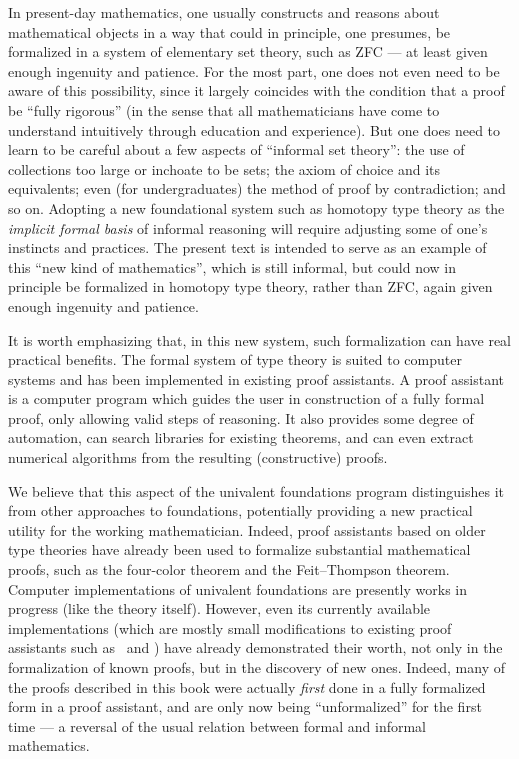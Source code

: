 In present-day mathematics, one usually constructs and reasons about mathematical objects in a way that could in principle, one presumes, be formalized in a system of elementary set theory, such as ZFC --- at least given enough ingenuity and patience.
For the most part, one does not even need to be aware of this possibility, since it largely coincides with the condition that a proof be ``fully rigorous'' (in the sense that all mathematicians have come to understand intuitively through education and experience).
But one does need to learn to be careful about a few aspects of ``informal set theory'': the use of collections too large or inchoate to be sets; the axiom of choice and its equivalents; even (for undergraduates) the method of proof by contradiction; and so on.
Adopting a new foundational system such as homotopy type theory as the \emph{implicit formal basis} of informal reasoning will require adjusting some of one's instincts and practices.
The present text is intended to serve as an example of this ``new kind of mathematics'', which is still informal, but could now in principle be formalized in homotopy type theory, rather than ZFC, again given enough ingenuity and patience.

It is worth emphasizing that, in this new system, such formalization can have real practical benefits.
The formal system of type theory is suited to computer systems and has been implemented in existing proof assistants.
A proof assistant is a computer program which guides the user in construction of a fully formal proof, only allowing valid steps of reasoning.
It also provides some degree of automation, can search libraries for existing theorems, and can even extract numerical algorithms from the resulting (constructive) proofs.

We believe that this aspect of the univalent foundations program distinguishes it from other approaches to foundations, potentially providing a new practical utility for the working mathematician.
Indeed, proof assistants based on older type theories have already been used to formalize substantial mathematical proofs, such as the four-color theorem and the Feit--Thompson theorem.
Computer implementations of univalent foundations are presently works in progress (like the theory itself).
However, even its currently available implementations (which are mostly small modifications to existing proof assistants such as \Coq\ and 
\Agda) have already demonstrated their worth, not only in the formalization of known proofs, but in the discovery of new ones.
Indeed, many of the proofs described in this book were actually \emph{first} done in a fully formalized form in a proof assistant, and are only now being ``unformalized'' for the first time --- a reversal of the usual relation between formal and informal mathematics.

